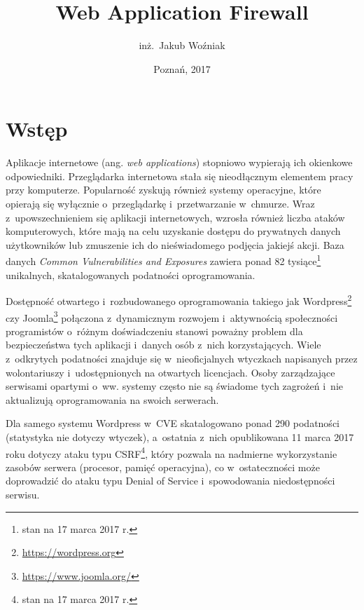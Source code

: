 \documentclass[12pt,a4paper,polish,thesis]{dcsbook}
\begin{document}
\author{inż.~Jakub Woźniak}
\title{Web Application Firewall}
\date{Poznań, 2017}
\maketitle
\frontmatter
\tableofcontents
\mainmatter


\chapter{Wstęp}

Aplikacje internetowe (ang. \textit{web applications}) stopniowo wypierają ich okienkowe odpowiedniki. Przeglądarka internetowa stała się nieodłącznym elementem pracy przy komputerze. Popularność zyskują również systemy operacyjne, które opierają się wyłącznie o~przeglądarkę i~przetwarzanie w~chmurze. Wraz z~upowszechnieniem się aplikacji internetowych, wzrosła również liczba ataków komputerowych, które mają na celu uzyskanie dostępu do prywatnych danych użytkowników lub zmuszenie ich do nieświadomego podjęcia jakiejś akcji. Baza danych \textit{Common Vulnerabilities and Exposures}\cite{cve} zawiera ponad 82 tysiące\footnote{stan na 17 marca 2017 r.} unikalnych, skatalogowanych podatności oprogramowania.

Dostępność otwartego i~rozbudowanego oprogramowania takiego jak Wordpress\footnote{\url{https://wordpress.org}} czy Joomla\footnote{\url{https://www.joomla.org/}} połączona z~dynamicznym rozwojem i~aktywnością społeczności programistów o~różnym doświadczeniu stanowi poważny problem dla bezpieczeństwa tych aplikacji i~danych osób z~nich korzystających. Wiele z~odkrytych podatności znajduje się w~nieoficjalnych wtyczkach napisanych przez wolontariuszy i~udostępnionych na otwartych licencjach. Osoby zarządzające serwisami opartymi o~ww. systemy często nie są świadome tych zagrożeń i~nie aktualizują oprogramowania na swoich serwerach. 

Dla samego systemu Wordpress w~CVE skatalogowano ponad 290 podatności (statystyka nie dotyczy wtyczek), a~ostatnia z~nich opublikowana 11 marca 2017 roku dotyczy ataku typu CSRF\footnote{stan na 17 marca 2017 r.}, który pozwala na nadmierne wykorzystanie zasobów serwera (procesor, pamięć operacyjna), co w~ostateczności może doprowadzić do ataku typu Denial of Service i~spowodowania niedostępności serwisu.
\end{document}
